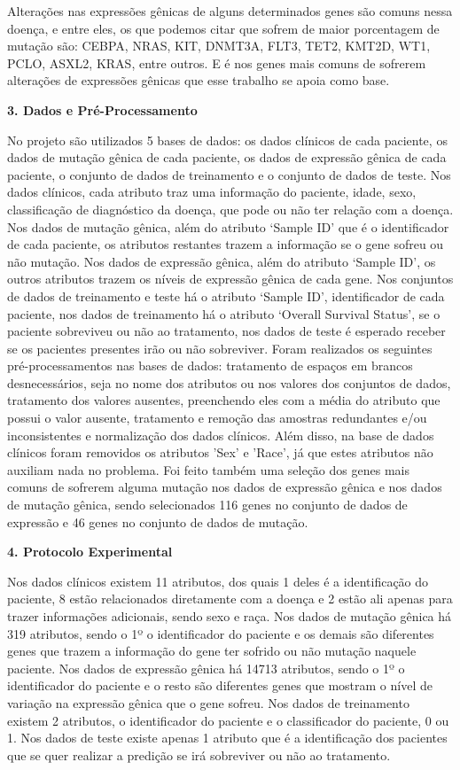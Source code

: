 \documentclass{article}
\begin{document}
\begin{multicols}{2}
Alterações nas expressões gênicas de alguns determinados genes são comuns nessa doença, e entre eles, os que podemos citar que sofrem de maior porcentagem de mutação são: CEBPA, NRAS, KIT, DNMT3A, FLT3, TET2, KMT2D, WT1, PCLO, ASXL2, KRAS, entre outros.
E é nos genes mais comuns de sofrerem alterações de expressões gênicas que esse trabalho se apoia como base.

\textbf{3. Dados e Pré-Processamento}

No projeto são utilizados 5 bases de dados: os dados clínicos de cada paciente, os dados de mutação gênica de cada paciente, os dados de expressão gênica de cada paciente, o conjunto de dados de treinamento e o conjunto de dados de teste. Nos dados clínicos, cada atributo traz uma informação do paciente, idade, sexo, classificação de diagnóstico da doença, que pode ou não ter relação com a doença. Nos dados de mutação gênica, além do atributo ‘Sample ID’ que é o identificador de cada paciente, os atributos restantes trazem a informação se o gene sofreu ou não mutação. Nos dados de expressão gênica, além do atributo ‘Sample ID’, os outros atributos trazem os níveis de expressão gênica de cada gene. Nos conjuntos de dados de treinamento e teste há o atributo ‘Sample ID’, identificador de cada paciente, nos dados de treinamento há o atributo ‘Overall Survival Status’, se o paciente sobreviveu ou não ao tratamento, nos dados de teste é esperado receber se os pacientes presentes irão ou não sobreviver.
Foram realizados os seguintes pré-processamentos nas bases de dados: tratamento de espaços em brancos desnecessários, seja no nome dos atributos ou nos valores dos conjuntos de dados, tratamento dos valores ausentes, preenchendo eles com a média do atributo que possui o valor ausente, tratamento e remoção das amostras redundantes e/ou inconsistentes e normalização dos dados clínicos.
Além disso, na base de dados clínicos foram removidos os atributos 'Sex' e 'Race', já que estes atributos não auxiliam nada no problema. Foi feito também uma seleção dos genes mais comuns de sofrerem alguma mutação nos dados de expressão gênica e nos dados de mutação gênica, sendo selecionados 116 genes no conjunto de dados de expressão e 46 genes no conjunto de dados de mutação.

\textbf{4. Protocolo Experimental}

Nos dados clínicos existem 11 atributos, dos quais 1 deles é a identificação do paciente, 8 estão relacionados diretamente com a doença e 2 estão ali apenas para trazer informações adicionais, sendo sexo e raça. Nos dados de mutação gênica há 319 atributos, sendo o 1º o identificador do paciente e os demais  são diferentes genes que trazem a informação do gene ter sofrido ou não mutação naquele paciente. Nos dados de expressão gênica há 14713 atributos, sendo o 1º o identificador do paciente e o resto são diferentes genes que mostram o nível de variação na expressão gênica que o gene sofreu. Nos dados de treinamento existem 2 atributos, o identificador do paciente e o classificador do paciente, 0 ou 1. Nos dados de teste existe apenas 1 atributo que é a identificação dos pacientes que se quer realizar a predição se irá sobreviver ou não ao tratamento.


\end{multicols}
\end{document}
